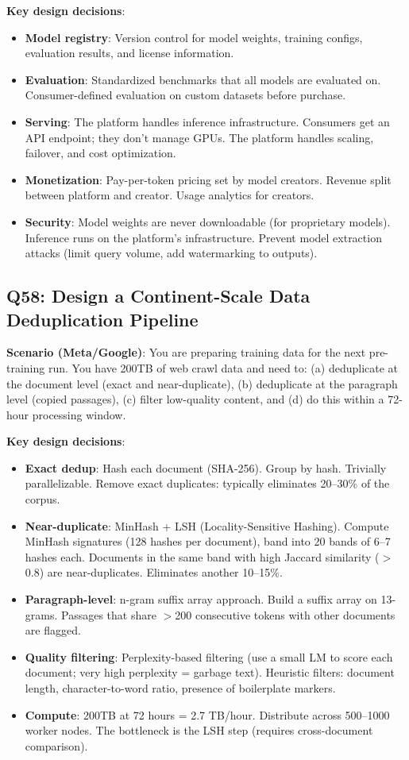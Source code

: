 \textbf{Key design decisions}:
\begin{itemize}[leftmargin=*]
    \item \textbf{Model registry}: Version control for model weights, training configs, evaluation results, and license information.
    \item \textbf{Evaluation}: Standardized benchmarks that all models are evaluated on. Consumer-defined evaluation on custom datasets before purchase.
    \item \textbf{Serving}: The platform handles inference infrastructure. Consumers get an API endpoint; they don't manage GPUs. The platform handles scaling, failover, and cost optimization.
    \item \textbf{Monetization}: Pay-per-token pricing set by model creators. Revenue split between platform and creator. Usage analytics for creators.
    \item \textbf{Security}: Model weights are never downloadable (for proprietary models). Inference runs on the platform's infrastructure. Prevent model extraction attacks (limit query volume, add watermarking to outputs).
\end{itemize}

\subsection{Q58: Design a Continent-Scale Data Deduplication Pipeline}

\textbf{Scenario (Meta/Google)}: You are preparing training data for the next pre-training run. You have 200TB of web crawl data and need to: (a) deduplicate at the document level (exact and near-duplicate), (b) deduplicate at the paragraph level (copied passages), (c) filter low-quality content, and (d) do this within a 72-hour processing window.

\textbf{Key design decisions}:
\begin{itemize}[leftmargin=*]
    \item \textbf{Exact dedup}: Hash each document (SHA-256). Group by hash. Trivially parallelizable. Remove exact duplicates: typically eliminates 20--30\% of the corpus.
    \item \textbf{Near-duplicate}: MinHash + LSH (Locality-Sensitive Hashing). Compute MinHash signatures (128 hashes per document), band into 20 bands of 6--7 hashes each. Documents in the same band with high Jaccard similarity ($>$0.8) are near-duplicates. Eliminates another 10--15\%.
    \item \textbf{Paragraph-level}: n-gram suffix array approach. Build a suffix array on 13-grams. Passages that share $>$200 consecutive tokens with other documents are flagged.
    \item \textbf{Quality filtering}: Perplexity-based filtering (use a small LM to score each document; very high perplexity = garbage text). Heuristic filters: document length, character-to-word ratio, presence of boilerplate markers.
    \item \textbf{Compute}: 200TB at 72 hours = 2.7 TB/hour. Distribute across 500--1000 worker nodes. The bottleneck is the LSH step (requires cross-document comparison).
\end{itemize}

